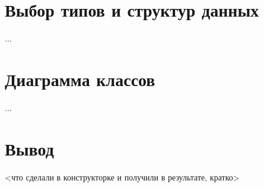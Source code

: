 \section{Выбор типов и структур данных}

...

\section{Диаграмма классов}

...

\section{Вывод}

<что сделали в конструкторке и получили в результате, кратко>

\clearpage
